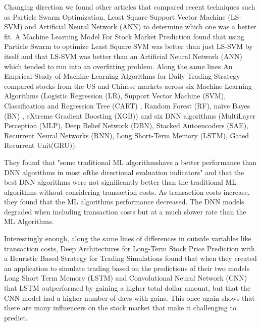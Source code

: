 \documentclass[conference]{IEEEtran}
\begin{document}
Changing direction we found other articles that compared recent techniques such as Particle Swarm Optimization, Least Square Support Vector Machine (LS-SVM) and Artificial Neural Network (ANN) to determine which one was a better fit.  A Machine Learning Model For Stock Market Prediction \cite{MLModelPrediction} found that using Particle Swarm to optimize Least Square SVM was better than just LS-SVM by itself and that LS-SVM was better than an Artificial Neural Network (ANN) which tended to run into an overfitting problem. Along the same lines An Emprical Study of Machine Learning Algorithms for Daily Trading Strategy \cite{EmpiricalStudy} compared stocks from the US and Chinese markets across six Machine Learning Algorithms (Logistic Regression (LR), Support Vector Machine (SVM), Classification and Regression Tree (CART) , Random Forest (RF), naïve Bayes (BN) , eXtreme Gradient Boosting (XGB)) and six DNN algorithms (MultiLayer Perception (MLP), Deep Belief Network (DBN), Stacked Autoencoders (SAE), Recurrent Neural Networks (RNN), Long Short-Term Memory (LSTM), Gated Recurrent Unit(GRU)). 

They found that "some traditional ML algorithmshave a better performance than DNN algorithms in most ofthe directional evaluation indicators" and that the best DNN algorithms were not significantly better than the traditional ML algorithms without considering transaction costs.  As transaction costs increase, they found that the ML algorithms performance decreased.  The DNN models degraded when including transaction costs but at a much slower rate than the ML Algorithms.

Interestingly enough, along the same lines of differences in outside variables like transaction costs, Deep Architectures for Long-Term Stock Price Prediction with a Heuristic Based Strategy for Trading Simulations \cite{LongTermPricePrediction} found that when they created an application to simulate trading based on the predictions of their two models Long Short Term Memory (LSTM) and Convolutional Neural Network (CNN) that LSTM outperformed by gaining a higher total dollar amount, but that the CNN model had a higher number of days with gains.  This once again shows that there are many influencers on the stock market that make it challenging to predict.



\end{document}
